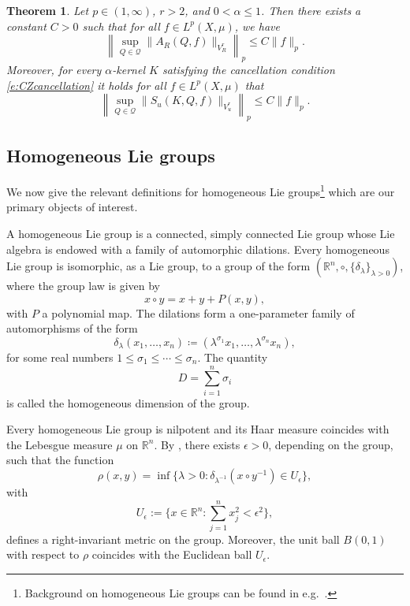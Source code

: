 \documentclass[12pt,reqno,a4paper,dvipsnames]{amsart}
\theoremstyle{plain}
\newtheorem{theorem}{Theorem}
\theoremstyle{definition}
\numberwithin{theorem}{section}
\numberwithin{equation}{section}
\newcommand{\AD}{D}
\begin{document}
\begin{theorem}\label{t:metric}
Let $p \in (1,\infty)$, $r>2$, and $0<\alpha\leq 1$. Then there exists a constant $C > 0$ such that for all $f\in L^p(X,\mu)$, we have 
\begin{equation}\label{e:thm ShTru2}
    \left\| \sup_{Q \in \mathcal{Q}}
    \bigl\| A_R(Q, f) \bigr\|_{V^r_R} \right\|_p
    \le C \|f\|_p.
\end{equation}
Moreover, for every $\alpha$-kernel $K$ satisfying the cancellation condition \eqref{e:CZcancellation} it holds for all $f\in L^p(X,\mu)$ that 
\begin{equation}\label{e:thm ShTru1}
    \left\| \sup_{Q \in \mathcal{Q}}
    \bigl\| S_u(K, Q, f) \bigr\|_{V^r_u} \right\|_p
    \le C \|f\|_p.
\end{equation}
\end{theorem}



\subsection{Homogeneous Lie groups}
\label{ss:lie}

We now give the relevant definitions for homogeneous Lie groups\footnote{Background on homogeneous Lie groups can be found in e.g.~\cite{bonfiglioli,ledonne-book}.} which are our primary objects of interest. 

A homogeneous Lie group is a connected, simply connected Lie group whose Lie algebra is endowed with a family of automorphic dilations. Every homogeneous Lie group is isomorphic, as a Lie group, to a group of the form $(\mathbb{R}^n, \circ, \{\delta_\lambda\}_{\lambda>0})$, where the group law is given by
\[
x \circ y = x + y + P(x,y),
\]
with $P$ a polynomial map. The dilations form a one-parameter family of automorphisms of the form
\[
\delta_\lambda(x_1,\ldots,x_n)
    \coloneqq (\lambda^{\sigma_1} x_1, \ldots, \lambda^{\sigma_n} x_n),
\]
for some real numbers $1 \leq \sigma_1 \leq \cdots \leq \sigma_n$. The quantity
\[
\AD = \sum_{i=1}^n \sigma_i
\]
is called the homogeneous dimension of the group.

Every homogeneous Lie group is nilpotent and its Haar measure coincides with the Lebesgue measure $\mu$ on $\mathbb{R}^n$. By \cite[Theorem~2]{hebisch1990smooth}, there exists $\epsilon > 0$, depending on the group, such that the function
\begin{equation}\label{e:def homgp rho}
    \rho(x,y) = \inf\{\lambda > 0 : \delta_{\lambda^{-1}}(x \circ y^{-1}) \in U_\epsilon\},
\end{equation}
with
\[
U_\epsilon := \{x \in \mathbb{R}^n : \sum_{j=1}^n x_j^2 < \epsilon^2\},
\]
defines a right-invariant metric on the group. Moreover, the unit ball $B(0,1)$ with respect to $\rho$ coincides with the Euclidean ball $U_\epsilon$. 
\end{document}
